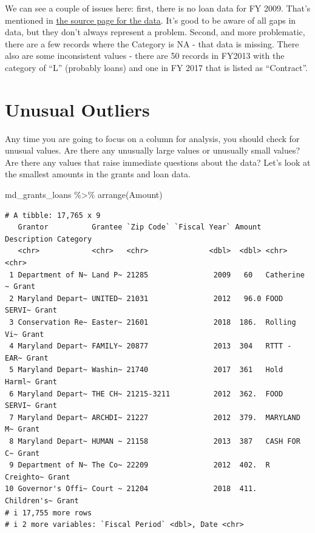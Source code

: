 \documentclass[
  letterpaper,
  DIV=11,
  numbers=noendperiod]{scrreprt}
\newenvironment{Shaded}{\begin{snugshade}}{\end{snugshade}}
\newcommand{\FunctionTok}[1]{\textcolor[rgb]{0.28,0.35,0.67}{#1}}
\newcommand{\NormalTok}[1]{\textcolor[rgb]{0.00,0.23,0.31}{#1}}
\newcommand{\SpecialCharTok}[1]{\textcolor[rgb]{0.37,0.37,0.37}{#1}}
\begin{document}
We can see a couple of issues here: first, there is no loan data for FY
2009. That's mentioned in
\href{https://opendata.maryland.gov/Budget/State-of-Maryland-Grant-and-Loan-Data-FY2009-to-FY/absk-avps}{the
source page for the data}. It's good to be aware of all gaps in data,
but they don't always represent a problem. Second, and more problematic,
there are a few records where the Category is NA - that data is missing.
There also are some inconsistent values - there are 50 records in FY2013
with the category of ``L'' (probably loans) and one in FY 2017 that is
listed as ``Contract''.

\hypertarget{unusual-outliers}{%
\section{Unusual Outliers}\label{unusual-outliers}}

Any time you are going to focus on a column for analysis, you should
check for unusual values. Are there any unusually large values or
unusually small values? Are there any values that raise immediate
questions about the data? Let's look at the smallest amounts in the
grants and loan data.

\begin{Shaded}
\begin{Highlighting}[]
\NormalTok{md\_grants\_loans }\SpecialCharTok{\%\textgreater{}\%} 
  \FunctionTok{arrange}\NormalTok{(Amount)}
\end{Highlighting}
\end{Shaded}

\begin{verbatim}
# A tibble: 17,765 x 9
   Grantor          Grantee `Zip Code` `Fiscal Year` Amount Description Category
   <chr>            <chr>   <chr>              <dbl>  <dbl> <chr>       <chr>   
 1 Department of N~ Land P~ 21285               2009   60   Catherine ~ Grant   
 2 Maryland Depart~ UNITED~ 21031               2012   96.0 FOOD SERVI~ Grant   
 3 Conservation Re~ Easter~ 21601               2018  186.  Rolling Vi~ Grant   
 4 Maryland Depart~ FAMILY~ 20877               2013  304   RTTT - EAR~ Grant   
 5 Maryland Depart~ Washin~ 21740               2017  361   Hold Harml~ Grant   
 6 Maryland Depart~ THE CH~ 21215-3211          2012  362.  FOOD SERVI~ Grant   
 7 Maryland Depart~ ARCHDI~ 21227               2012  379.  MARYLAND M~ Grant   
 8 Maryland Depart~ HUMAN ~ 21158               2013  387   CASH FOR C~ Grant   
 9 Department of N~ The Co~ 22209               2012  402.  R Creighto~ Grant   
10 Governor's Offi~ Court ~ 21204               2018  411.  Children's~ Grant   
# i 17,755 more rows
# i 2 more variables: `Fiscal Period` <dbl>, Date <chr>
\end{verbatim}
\end{document}
